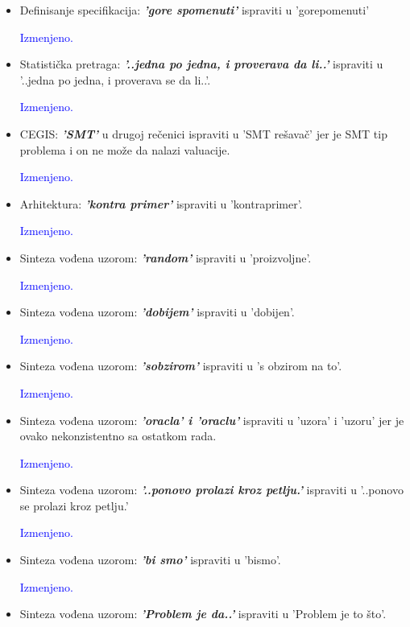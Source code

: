 \documentclass[a4paper]{report}
\newcommand{\odgovor}[1]{\textcolor{blue}{#1}}
\begin{document}
\begin{itemize}
    \item Definisanje specifikacija: \textbf{\textit{'gore spomenuti'}} ispraviti u 'gorepomenuti'

    \odgovor{Izmenjeno.}

    \item Statistička pretraga: \textbf{\textit{'..jedna po jedna, i proverava da li..'}} ispraviti u '..jedna po jedna, i proverava se da li..'.

    \odgovor{Izmenjeno.}

    \item CEGIS: \textbf{\textit{'SMT'}} u drugoj rečenici ispraviti u 'SMT rešavač' jer je SMT tip problema i on ne može da nalazi valuacije.

    \odgovor{Izmenjeno.}

    \item Arhitektura: \textbf{\textit{'kontra primer'}} ispraviti u 'kontraprimer'.

	\odgovor{Izmenjeno.}

    \item Sinteza vođena uzorom: \textbf{\textit{'random'}} ispraviti u 'proizvoljne'.

	\odgovor{Izmenjeno.}

    \item Sinteza vođena uzorom: \textbf{\textit{'dobijem'}} ispraviti u 'dobijen'.

	\odgovor{Izmenjeno.}

    \item Sinteza vođena uzorom: \textbf{\textit{'sobzirom'}} ispraviti u 's obzirom na to'.

    \odgovor{Izmenjeno.}

	\item Sinteza vođena uzorom: \textbf{\textit{'oracla' i 'oraclu'}} ispraviti u 'uzora' i 'uzoru' jer je ovako nekonzistentno sa ostatkom rada.

    \odgovor{Izmenjeno.}

    \item Sinteza vođena uzorom: \textbf{\textit{'..ponovo prolazi kroz petlju.'}} ispraviti u '..ponovo se prolazi kroz petlju.'

    \odgovor{Izmenjeno.}

    \item Sinteza vođena uzorom: \textbf{\textit{'bi smo'}} ispraviti u 'bismo'.

    \odgovor{Izmenjeno.}

    \item Sinteza vođena uzorom: \textbf{\textit{'Problem je da..'}} ispraviti u 'Problem je to što'.


\end{itemize}
\end{document}
